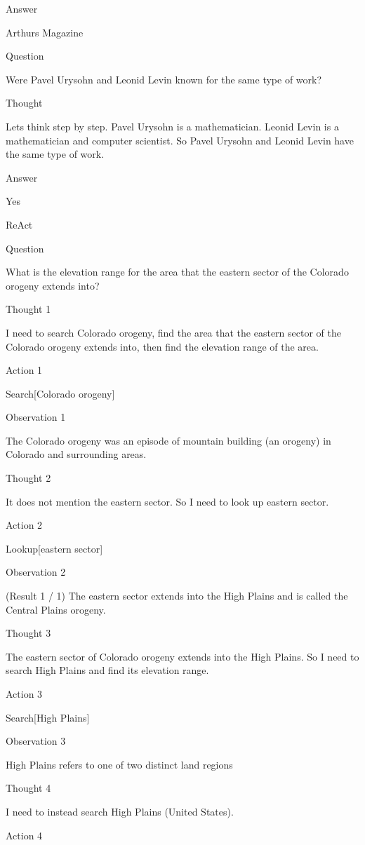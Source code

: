 \documentclass[
]{article}
\begin{document}
Answer

Arthur\textquotesingle s Magazine

Question

Were Pavel Urysohn and Leonid Levin known for the same type of work?

Thought

Let\textquotesingle s think step by step. Pavel Urysohn is a
mathematician. Leonid Levin is a mathematician and computer scientist.
So Pavel Urysohn and Leonid Levin have the same type of work.

Answer

Yes

ReAct

Question

What is the elevation range for the area that the eastern sector of the
Colorado orogeny extends into?

Thought 1

I need to search Colorado orogeny, find the area that the eastern sector
of the Colorado orogeny extends into, then find the elevation range of
the area.

Action 1

Search{[}Colorado orogeny{]}

Observation 1

The Colorado orogeny was an episode of mountain building (an orogeny) in
Colorado and surrounding areas.

Thought 2

It does not mention the eastern sector. So I need to look up eastern
sector.

Action 2

Lookup{[}eastern sector{]}

Observation 2

(Result 1 / 1) The eastern sector extends into the High Plains and is
called the Central Plains orogeny.

Thought 3

The eastern sector of Colorado orogeny extends into the High Plains. So
I need to search High Plains and find its elevation range.

Action 3

Search{[}High Plains{]}

Observation 3

High Plains refers to one of two distinct land regions

Thought 4

I need to instead search High Plains (United States).

Action 4
\end{document}
